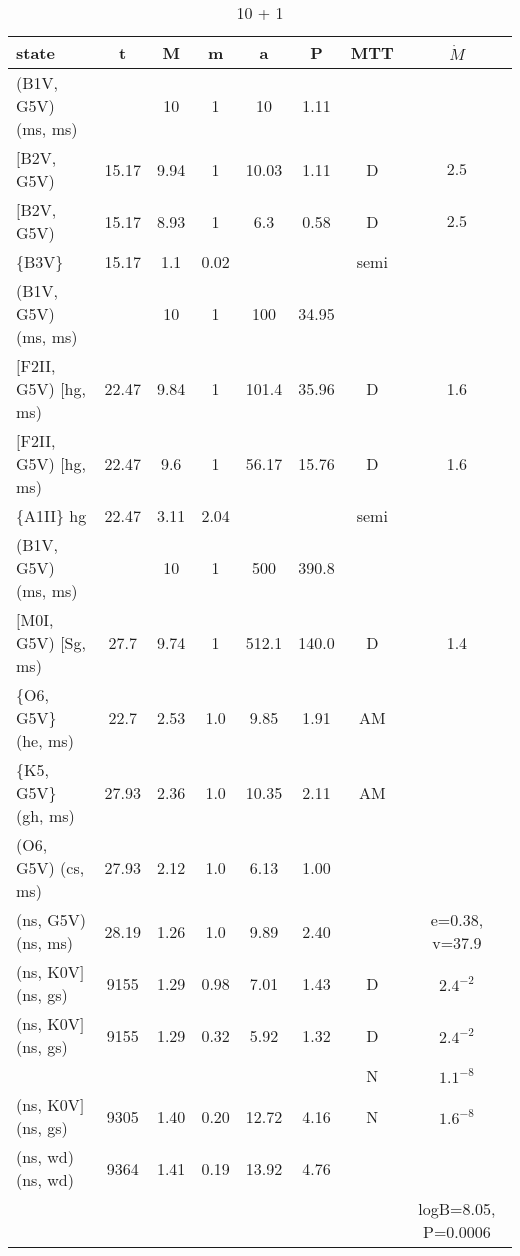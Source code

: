 \documentclass{article}
\begin{document}
\begin{table}
\caption{ 10 + 1}
\begin{tabular}{p{4cm}ccccccc}
\hline
state 		    	& t 	& M	& m	& a	& P	& MTT	&$\dot{M}$		\\ \hline 
(B1V, G5V) (ms, ms)	& 	& 10	& 1	& 10	& 1.11	&   				\\
$[$B2V, G5V) 		& 15.17	& 9.94	& 1	& 10.03	& 1.11  & D     & $2.5$                 \\
$[$B2V, G5V) 		& 15.17	& 8.93	& 1	& 6.3	& 0.58  & D     & $2.5$                 \\
\{B3V\}			& 15.17	& 1.1 	& 0.02	&      	&       & semi  &                       \\ \hline
(B1V, G5V) (ms, ms)	& 	& 10	& 1	& 100	& 34.95	&   				\\
$[$F2II, G5V) $[$hg, ms)	& 22.47	& 9.84	& 1	& 101.4	& 35.96	& D	& 1.6			\\
$[$F2II, G5V) $[$hg, ms)	& 22.47	& 9.6	& 1	& 56.17	& 15.76	& D	& 1.6			\\
\{A1II\} hg		& 22.47	& 3.11	& 2.04	&      	&       & semi  &                       \\ \hline
(B1V, G5V) (ms, ms)	& 	& 10	& 1	& 500	& 390.8	&   				\\
$[$M0I, G5V) $[$Sg, ms)	& 27.7	& 9.74	& 1	& 512.1	& 140.0	& D	& 1.4			\\
\{O6, G5V\} (he, ms)	& 22.7	& 2.53	& 1.0	& 9.85 	& 1.91  & AM    &                       \\ 
\{K5, G5V\} (gh, ms)	& 27.93	& 2.36	& 1.0	& 10.35	& 2.11  & AM    &                       \\ 
(O6, G5V) (cs, ms)	& 27.93	& 2.12	& 1.0	& 6.13 	& 1.00  &       &                       \\ 
(ns,  G5V) (ns, ms)	& 28.19	& 1.26	& 1.0	& 9.89 	& 2.40  &       & e=0.38, v=37.9        \\ 
(ns,  K0V$]$ (ns, gs)	& 9155 	& 1.29	& 0.98	& 7.01 	& 1.43  & D     & $2.4^{-2}$            \\
(ns,  K0V$]$ (ns, gs)	& 9155 	& 1.29	& 0.32	& 5.92 	& 1.32  & D     & $2.4^{-2}$            \\
			&	& 	&	&	&	& N	& $1.1^{-8}$            \\
(ns,  K0V$]$ (ns, gs)	& 9305 	& 1.40	& 0.20	& 12.72	& 4.16  & N     & $1.6^{-8}$            \\
(ns,  wd) (ns, wd)	& 9364 	& 1.41	& 0.19	& 13.92	& 4.76  &       &                       \\ 
			&	& 	&	&	&	& 	& logB=8.05, P=0.0006	\\ \hline

\end{tabular}
\end{table}
\end{document}
